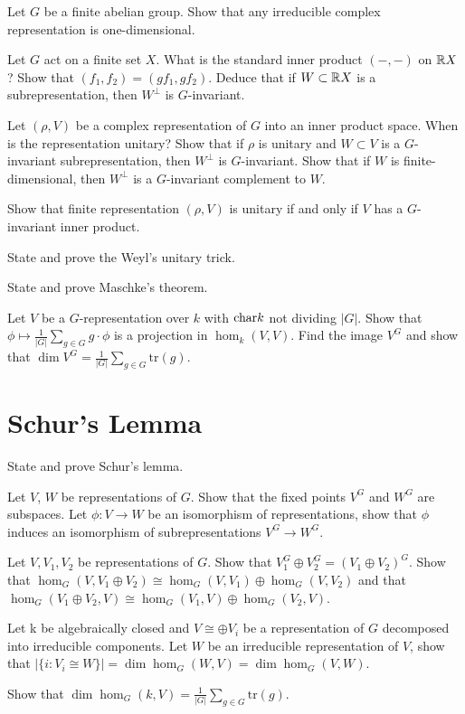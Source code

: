 \begin{question}{10}
	Let $G$ be a finite abelian group. Show that any irreducible complex representation is one-dimensional.
\end{question}

\begin{question}{11}
	Let $G$ act on a finite set $X$. What is the standard inner product $(-,-)$ on $\mathbb{R} X$? Show that $(f_1,f_2) = (gf_1,gf_2)$. Deduce that if $W \subset \mathbb{R} X$ is a subrepresentation, then $W^\bot$ is $G$-invariant. 
	
	Let $(\rho,V)$ be a complex representation of $G$ into an inner product space. When is the representation unitary? Show that if $\rho$ is unitary and $W \subset V$ is a $G$-invariant subrepresentation, then $W^\bot$ is $G$-invariant.  Show that if $W$ is finite-dimensional, then $W^\bot$ is a $G$-invariant complement to $W$.
\end{question}

\begin{question}{12}
	Show that finite representation $(\rho,V)$ is unitary if and only if $V$ has a $G$-invariant inner product.
	
	State and prove the Weyl's unitary trick.
\end{question}

\begin{question}{13}
	State and prove Maschke's theorem. 
	
	Let $V$ be a $G$-representation over $k$ with $\text{char} k$ not dividing $|G|$. Show that $\phi \mapsto \frac{1}{|G|}\sum_{g\in G} g \cdot \phi$ is a projection in $\hom_k(V,V)$. Find the image $V^G$ and show that $\dim V^G = \frac{1}{|G|}\sum_{g\in G} \text{tr}(g)$.
\end{question}

\section{Schur's Lemma}
\begin{question}{14}
	State and prove Schur's lemma.
	
	Let $V$, $W$ be representations of $G$. Show that the fixed points $V^G$ and $W^G$ are subspaces. Let $\phi : V \rightarrow W$ be an isomorphism of representations, show that $\phi$ induces an isomorphism of subrepresentations $V^G \rightarrow W^G$.
	
	Let $V,V_1,V_2$ be representations of $G$.
	Show that $V_1^G \oplus V_2^G = (V_1\oplus V_2)^G$. Show that $\hom_G(V,V_1 \oplus V_2) \cong \hom_G(V,V_1) \oplus \hom_G(V,V_2)$ and that $\hom_G(V_1 \oplus V_2,V) \cong \hom_G(V_1,V) \oplus \hom_G(V_2,V)$.
	
	Let k be algebraically closed and $V \cong \oplus V_i$ be a representation of $G$ decomposed into irreducible components. Let $W$ be an irreducible representation of $V$, show that $|\{i: V_i \cong W\}| = \dim \hom_G(W,V) = \dim \hom_G(V,W)$.
	
	Show that $\dim \hom_G(k,V) = \frac{1}{|G|}\sum_{g\in G} \text{tr}(g)$.
\end{question}

